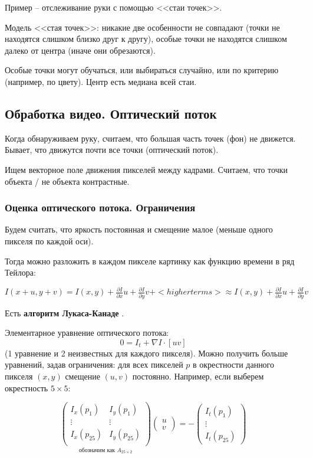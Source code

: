 \documentclass[main.tex]{subfiles}
\begin{document}
Пример -- отслеживание руки с помощью <<стаи точек>>.

Модель <<стая точек>>: никакие две особенности не совпадают (точки не находятся слишком близко друг к другу), особые точки не находятся слишком далеко от центра (иначе они обрезаются).

Особые точки могут обучаться, или выбираться случайно, или по критерию (например, по цвету).
Центр есть медиана всей стаи.

\subsection{Обработка видео. Оптический поток}

Когда обнаруживаем руку, считаем, что большая часть точек (фон) не движется.
Бывает, что движутся почти все точки (оптический поток).

Ищем векторное поле движения пикселей между кадрами.
Считаем, что точки объекта / не объекта контрастные.

\subsubsection{ Оценка оптического потока. Ограничения }

Будем считать, что яркость постоянная и смещение малое (меньше одного пикселя по каждой оси).

Тогда можно разложить в каждом пикселе картинку как функцию времени в ряд Тейлора:

$ I(x + u, y + v) = I(x,y) + \frac{\partial I}{\partial x} u + \frac{\partial I}{\partial y} v + <higher terms> \approx I(x,y) + \frac{\partial I}{\partial x} u + \frac{\partial I}{\partial y} v $

Есть \textbf{алгоритм Лукаса-Канаде }.

Элементарное уравнение оптического потока:
$$ 0 = I_t + \nabla I \cdot [u v] $$
(1 уравнение и 2 неизвестных для каждого пикселя).
Можно получить больше уравнений, задав ограничения:
для всех пикселей $ p $ в окрестности данного пикселя $ (x,y) $ смещение $ (u,v) $ постоянно.
Например, если выберем окрестность $ 5 \times 5 $:

$$ \underset{\text{обозначим как } A_{25 \times 2}}{
	\begin{pmatrix}
	I_x(p_1) & I_y(p_1) \\
	\vdots & \vdots \\
	I_x(p_{25}) & I_y(p_{25}) \\
	\end{pmatrix} }
\begin{pmatrix}
u \\ v
\end{pmatrix} = - \begin{pmatrix}
I_t(p_1) \\ \vdots \\ I_t(p_25)
\end{pmatrix} $$
\end{document}

